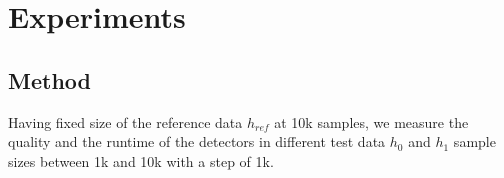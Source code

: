 \documentclass[12pt]{report}
\begin{document}
\chapter{Experiments}

\section{Method}

Having fixed size of the reference data \(h_{ref}\) at 10k samples, we measure the quality and the runtime of the detectors in different test data \(h_0\) and \(h_1\) sample sizes between 1k and 10k with a step of 1k.

\end{document}
